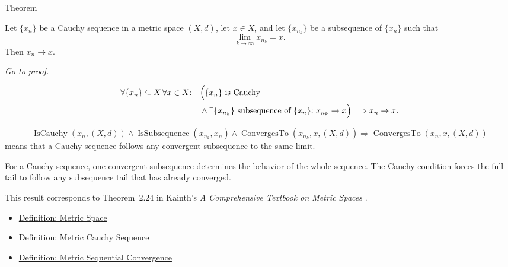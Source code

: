 \begin{theorembox}{Theorem}
\begin{theorem}
\label{thm:metric-cauchy-sequence-convergent-subsequence}
Let \(\{x_n\}\) be a Cauchy sequence in a metric space \((X,d)\), let
\(x\in X\), and let \(\{x_{n_k}\}\) be a subsequence of \(\{x_n\}\) such that
\[
  \lim_{k\to\infty}x_{n_k}=x.
\]
Then \(x_n\to x\).

\smallskip
\noindent
\hyperref[prf:metric-cauchy-sequence-convergent-subsequence]{\textit{Go to proof.}}
\end{theorem}
\end{theorembox}

\begin{remark*}
\[
\begin{aligned}
\forall \{x_n\}\subseteq X\,\forall x\in X{:}\quad
&\Bigl(
\{x_n\}\text{ is Cauchy}
\\
&{}\land
\exists\{x_{n_k}\}\text{ subsequence of }\{x_n\}{:}\ x_{n_k}\to x
\Bigr)
\Longrightarrow
x_n\to x.
\end{aligned}
\]
\end{remark*}

\begin{remark*}
\[
\operatorname{IsCauchy}(x_n,(X,d))
\land
\operatorname{IsSubsequence}(x_{n_k},x_n)
\land
\operatorname{ConvergesTo}(x_{n_k},x,(X,d))
\Longrightarrow
\operatorname{ConvergesTo}(x_n,x,(X,d))
\]
means that a Cauchy sequence follows any convergent subsequence to the same
limit.
\end{remark*}

\begin{remark*}[Interpretation]
For a Cauchy sequence, one convergent subsequence determines the behavior of
the whole sequence.  The Cauchy condition forces the full tail to follow any
subsequence tail that has already converged.
\end{remark*}

\begin{remark*}
This result corresponds to Theorem~2.24 in Kainth's
\emph{A Comprehensive Textbook on Metric Spaces}
\cite{KainthComprehensiveMetricSpaces2023}.
\end{remark*}

\begin{dependencies}
\begin{itemize}
  \item \hyperref[def:metric-space]{Definition: Metric Space}
  \item \hyperref[def:metric-cauchy-sequence]{Definition: Metric Cauchy Sequence}
  \item \hyperref[def:metric-sequential-convergence]{Definition: Metric Sequential Convergence}
\end{itemize}
\end{dependencies}

